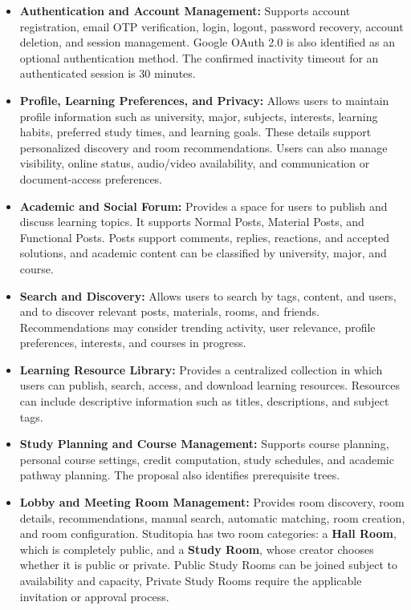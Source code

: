 \documentclass[12pt]{article}
\begin{document}
\begin{itemize}
\item \textbf{Authentication and Account Management:} Supports account registration, email OTP verification, login, logout, password recovery, account deletion, and session management. Google OAuth 2.0 is also identified as an optional authentication method. The confirmed inactivity timeout for an authenticated session is 30 minutes.
\par
\item \textbf{Profile, Learning Preferences, and Privacy:} Allows users to maintain profile information such as university, major, subjects, interests, learning habits, preferred study times, and learning goals. These details support personalized discovery and room recommendations. Users can also manage visibility, online status, audio/\allowbreak{}video availability, and communication or document-access preferences.
\par
\item \textbf{Academic and Social Forum:} Provides a space for users to publish and discuss learning topics. It supports Normal Posts, Material Posts, and Functional Posts. Posts support comments, replies, reactions, and accepted solutions, and academic content can be classified by university, major, and course.
\par
\item \textbf{Search and Discovery:} Allows users to search by tags, content, and users, and to discover relevant posts, materials, rooms, and friends. Recommendations may consider trending activity, user relevance, profile preferences, interests, and courses in progress.
\par
\item \textbf{Learning Resource Library:} Provides a centralized collection in which users can publish, search, access, and download learning resources. Resources can include descriptive information such as titles, descriptions, and subject tags.
\par
\item \textbf{Study Planning and Course Management:} Supports course planning, personal course settings, credit computation, study schedules, and academic pathway planning. The proposal also identifies prerequisite trees.
\par
\item \textbf{Lobby and Meeting Room Management:} Provides room discovery, room details, recommendations, manual search, automatic matching, room creation, and room configuration. Studitopia has two room categories: a \textbf{Hall Room}, which is completely public, and a \textbf{Study Room}, whose creator chooses whether it is public or private. Public Study Rooms can be joined subject to availability and capacity, Private Study Rooms require the applicable invitation or approval process.

\end{itemize}
\end{document}
